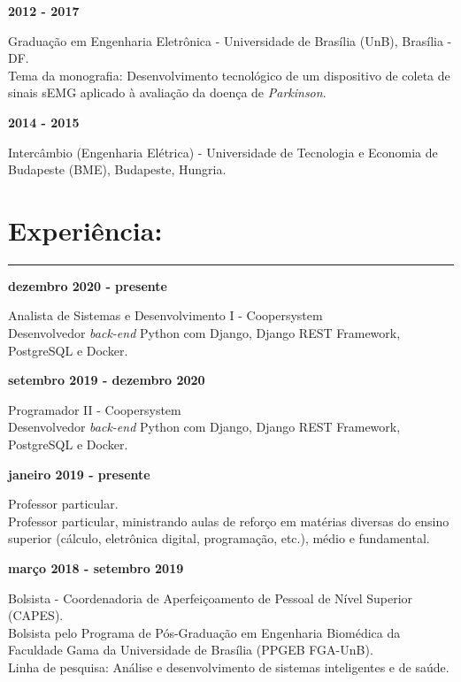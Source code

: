 \documentclass[11pt]{article}
\begin{document}
\textbf{2012 - 2017}
\begin{addmargin}{0.5cm}
Graduação em Engenharia Eletrônica - Universidade de Brasília (UnB), Brasília - DF. \\
Tema da monografia: Desenvolvimento tecnológico de um dispositivo de coleta
de sinais sEMG aplicado à avaliação da doença de \textit{Parkinson}.\\
\end{addmargin}

\textbf{2014 - 2015} 
\begin{addmargin}{0.5cm}
Intercâmbio (Engenharia Elétrica) - Universidade de Tecnologia e Economia de Budapeste (BME), Budapeste, Hungria. 
\end{addmargin}

\section{Experiência:}
\hrule \vspace{0.1cm}


\textbf{dezembro 2020 - presente}
\begin{addmargin}{0.5cm}
Analista de Sistemas e Desenvolvimento I - Coopersystem \\
Desenvolvedor \textit{back-end} Python com Django, Django REST Framework,
PostgreSQL e Docker.\\
\end{addmargin}

\textbf{setembro 2019 - dezembro 2020}
\begin{addmargin}{0.5cm}
Programador II - Coopersystem \\
Desenvolvedor \textit{back-end} Python com Django, Django REST Framework,
PostgreSQL e Docker.\\
\end{addmargin}

\newpage
\textbf{janeiro 2019 - presente}
\begin{addmargin}{0.5cm}
Professor particular. \\
Professor particular, ministrando aulas de reforço em matérias diversas
do ensino superior (cálculo, eletrônica digital, programação, etc.), médio
e fundamental.\\
\end{addmargin}

\textbf{março 2018 - setembro 2019}
\begin{addmargin}{0.5cm}
Bolsista - Coordenadoria de Aperfeiçoamento de Pessoal de Nível Superior (CAPES). \\
Bolsista pelo Programa de Pós-Graduação em Engenharia Biomédica
da Faculdade Gama da Universidade de Brasília (PPGEB FGA-UnB).\\
Linha de pesquisa: Análise e desenvolvimento de sistemas inteligentes e de saúde.\\
\end{addmargin}
\end{document}
